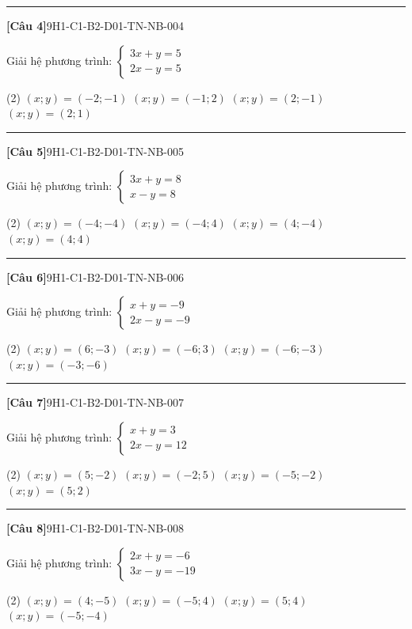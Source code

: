 \documentclass[12pt,a4paper]{article}
\newif\ifloigiai
\newenvironment{cauhoi}[2]{%
  \par\medskip\noindent\rule{\textwidth}{0.4pt}\par\nopagebreak
  \noindent\textbf{[#1]}\hfill{\scriptsize\ttfamily #2}\par\nopagebreak\smallskip}{\par}
\newcommand{\dapan}[1]{\ifloigiai\par\smallskip\noindent\textit{Đáp án:} \textbf{#1}\par\fi}
\begin{document}
\begin{cauhoi}{Câu 4}{9H1-C1-B2-D01-TN-NB-004}
Giải hệ phương trình: $\begin{cases}3x + y=5\\ 2x - y=5\end{cases}$
\begin{tasks}(2)
\task $(x;y)=(-2;-1)$
\task $(x;y)=(-1;2)$
\task $(x;y)=(2;-1)$
\task $(x;y)=(2;1)$
\end{tasks}
\dapan{C}
\end{cauhoi}
\begin{cauhoi}{Câu 5}{9H1-C1-B2-D01-TN-NB-005}
Giải hệ phương trình: $\begin{cases}3x + y=8\\ x - y=8\end{cases}$
\begin{tasks}(2)
\task $(x;y)=(-4;-4)$
\task $(x;y)=(-4;4)$
\task $(x;y)=(4;-4)$
\task $(x;y)=(4;4)$
\end{tasks}
\dapan{C}
\end{cauhoi}
\begin{cauhoi}{Câu 6}{9H1-C1-B2-D01-TN-NB-006}
Giải hệ phương trình: $\begin{cases}x + y=-9\\ 2x - y=-9\end{cases}$
\begin{tasks}(2)
\task $(x;y)=(6;-3)$
\task $(x;y)=(-6;3)$
\task $(x;y)=(-6;-3)$
\task $(x;y)=(-3;-6)$
\end{tasks}
\dapan{C}
\end{cauhoi}
\begin{cauhoi}{Câu 7}{9H1-C1-B2-D01-TN-NB-007}
Giải hệ phương trình: $\begin{cases}x + y=3\\ 2x - y=12\end{cases}$
\begin{tasks}(2)
\task $(x;y)=(5;-2)$
\task $(x;y)=(-2;5)$
\task $(x;y)=(-5;-2)$
\task $(x;y)=(5;2)$
\end{tasks}
\dapan{A}
\end{cauhoi}
\begin{cauhoi}{Câu 8}{9H1-C1-B2-D01-TN-NB-008}
Giải hệ phương trình: $\begin{cases}2x + y=-6\\ 3x - y=-19\end{cases}$
\begin{tasks}(2)
\task $(x;y)=(4;-5)$
\task $(x;y)=(-5;4)$
\task $(x;y)=(5;4)$
\task $(x;y)=(-5;-4)$
\end{tasks}
\dapan{B}
\end{cauhoi}
\end{document}

